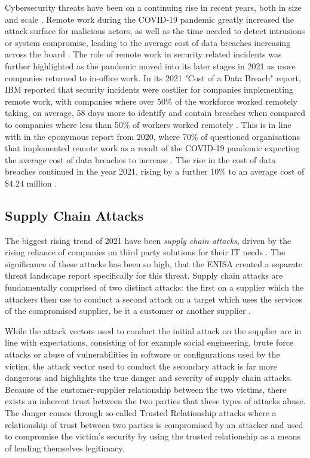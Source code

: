 Cybersecurity threats have been on a continuing rise in recent years, both in size and scale 
\cite{enisa_threat_landscape}. Remote work during the COVID-19 pandemic greatly increased
the attack surface for malicious actors, as well as the time needed to detect intrusions 
or system compromise, leading to the average cost of data breaches increasing across the
board \cite{ibm_2020_cost_of_a_data_breach}. The role of remote work in security related 
incidents was further highlighted as the pandemic moved into its later stages in 2021 as
more companies returned to in-office work. In its 2021 "Cost of a Data Breach" report,
IBM reported that security incidents were costlier for companies implementing remote work,
with companies where over 50\% of the workforce worked remotely taking, on average, 58 days
more to identify and contain breaches when compared to companies where less than 50\% of workers
worked remotely \cite{ibm_2021_cost_of_a_data_breach}. This is in line with in the eponymous 
report from 2020, where 70\% of questioned organisations that implemented remote work as a result of the 
COVID-19 pandemic expecting the average cost of data breaches to increase \cite{ibm_2020_cost_of_a_data_breach}. 
The rise in the cost of data breaches continued in the year 2021, rising by a further 10\% to an 
average cost of \$4.24 million \cite{ibm_2021_cost_of_a_data_breach}.

\subsection{Supply Chain Attacks} \label{sec:supply-chain-attacks}
The biggest rising trend of 2021 have been \emph{supply chain attacks}, driven by the rising reliance of 
companies on third party solutions for their IT needs \cite{enisa_threat_landscape, morphisec_threat_landscape}.
The significance of these attacks has been so high, that the \acrfull{ENISA} created a separate threat
landscape report specifically for this threat.
Supply chain attacks are fundamentally comprised of two distinct attacks: the first on a supplier which the 
attackers then use to conduct a second attack on a target which uses the services of the compromised supplier,
be it a customer or another supplier \cite{enisa_supply_chain_threat_landscape}.

While the attack vectors used to conduct the initial attack on the supplier are in line with expectations, 
consisting of for example social engineering, brute force attacks or abuse of vulnerabilities in software
or configurations used by the victim, the attack vector used to conduct the secondary attack is far more
dangerous and highlights the true danger and severity of supply chain attacks.
Because of the customer-supplier relationship between the two victims, there exists an inherent trust
between the two parties that these types of attacks abuse. The danger comes through so-called Trusted Relationship
attacks where a relationship of trust between two parties is compromised by an attacker and used to compromise
the victim's security by using the trusted relationship as a means of lending themselves legitimacy.

